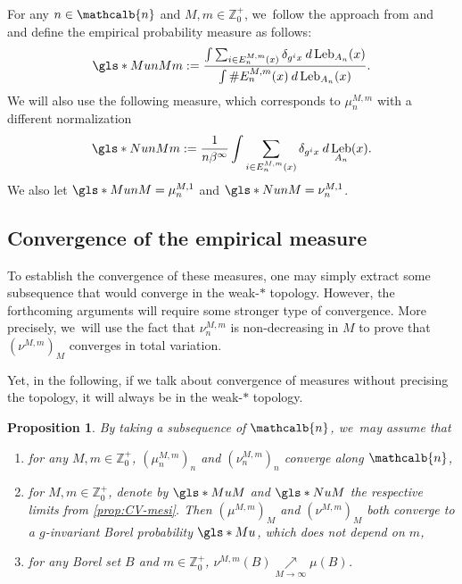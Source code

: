 \documentclass[JEP,XML,SOM,Unicode,NoFloatCountersInSection,published]{cedram}
\newenvironment{enumeratei}
{\bgroup\def\theenumi{\roman{enumi}}\def\theenumii{\arabic{enumii}}\begin{enumerate}}
{\end{enumerate}\egroup}
\DeclareMathOperator{\Leb}{Leb}
\newcommand{\mcbn}{{\mathcalb{n}}}
\newtheorem{prop}[thm]{Proposition}
\theoremstyle{definition}
\newcommand{\bbZ}{{\mathbb{Z}}}
\begin{document}
For any $n \in \mcbn$ and $M,m \in \bbZ_0^+$, we~follow the approach from \cite{BCS_cont} and \cite{burguet2024srbPH} and define the empirical probability measure as follows:
\[
\gls*{MunMm} := \frac{\int \sum_{i \in E_n^{M,m}(x)} \delta_{g^i x} \: d \Leb_{A_n}(x)}{\int \# E_n^{M,m}(x) \: d \Leb_{A_n}(x)}.
\]
We will also use the following measure, which corresponds to $\mu_n^{M,m}$ with a different normalization
\[
\gls*{NunMm} := \frac{1}{n \beta^{\infty}} \int \sum_{i \in E_n^{M,m}(x)} \delta_{g^i x} \: d \Leb_{A_n}(x).
\]
We also let $\gls*{MunM} = \mu_n^{M,1}$ and $\gls*{NunM} = \nu_n^{M,1}$.

\subsection{Convergence of the empirical measure}

To establish the convergence of these measures, one may simply extract some subsequence that would converge in the weak\nobreakdash-$*$ topology.
However, the forthcoming arguments will require some stronger type of convergence.
More precisely, we~will use the fact that $\nu_n^{M,m}$ is non-decreasing in $M$ to prove that $\left (\nu^{M,m} \right)_M$ converges in total variation.

Yet, in the following, if we talk about convergence of measures without precising the topology, it will always be in the weak\nobreakdash-$*$ topology.

\begin{prop}
\label{prop:CV-mes}
By taking a subsequence of $\mcbn$, we~may assume that
\begin{enumeratei}
\item\label{prop:CV-mesi}
 for any $M,m \in \bbZ_0^+$, $(\mu_n^{M,m})_n$ and $(\nu_n^{M,m})_n$ converge along $\mcbn$,
\item\label{prop:CV-mesii}
 for $M,m \in \bbZ_0^+$, denote by
$\gls*{MuM}$ and
$\gls*{NuM}$ the respective limits from \eqref{prop:CV-mesi}. Then $(\mu^{M,m})_M$ and $(\nu^{M,m})_M$ both converge to a $g$-invariant Borel probability
$\gls*{Mu}$, which does not depend on $m$,
\item\label{prop:CV-mesiii}
 for any Borel set $B$ and $m \in \bbZ_0^+$, $\nu^{M,m}(B) \underset{M \to \infty}{\nearrow} \mu(B)$.
\end{enumeratei}
\end{prop}
\end{document}
